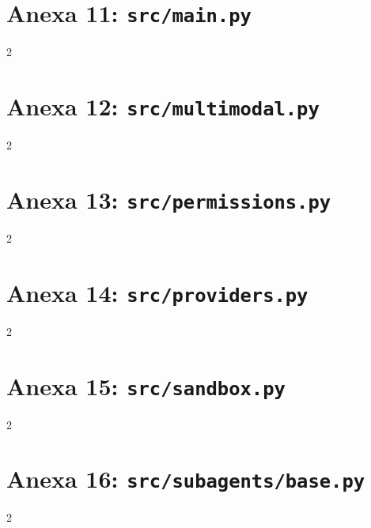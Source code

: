 \section*{Anexa 11: \texttt{src/main.py}}
\begin{multicols}{2}

\end{multicols}


\section*{Anexa 12: \texttt{src/multimodal.py}}
\begin{multicols}{2}

\end{multicols}


\section*{Anexa 13: \texttt{src/permissions.py}}
\begin{multicols}{2}

\end{multicols}


\section*{Anexa 14: \texttt{src/providers.py}}
\begin{multicols}{2}

\end{multicols}


\section*{Anexa 15: \texttt{src/sandbox.py}}
\begin{multicols}{2}

\end{multicols}


\section*{Anexa 16: \texttt{src/subagents/base.py}}
\begin{multicols}{2}

\end{multicols}

